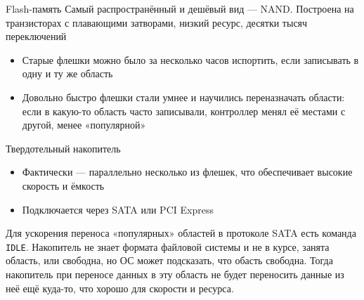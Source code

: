 \documentclass[xetex,aspectratio=43]{beamer}
\begin{document}
\begin{frame}
    \begin{block}{Flash-память}
        Самый распространённый и дешёвый вид --- NAND. Построена на транзисторах
        с плавающими затворами, низкий ресурс, десятки тысяч переключений

        \begin{itemize}
            \tightlist
            \item
            Старые флешки можно было за несколько часов испортить, если записывать
            в одну и ту же область
            \item
            Довольно быстро флешки стали умнее и научились переназначать области:
            если в какую-то область часто записывали, контроллер менял её местами
            с другой, менее «популярной»
        \end{itemize}
    \end{block}
\end{frame}

\begin{frame}[fragile]
    \begin{block}{Твердотельный накопитель}
        \begin{itemize}
            \tightlist
            \item
            Фактически --- параллельно несколько из флешек, что обеспечивает высокие скорость и
            ёмкость
            \item
            Подключается через SATA или PCI Express
        \end{itemize}

        Для ускорения переноса «популярных» областей в протоколе SATA есть
        команда \texttt{IDLE}. Накопитель не знает формата файловой системы и не
        в курсе, занята область, или свободна, но ОС может подсказать, что
        обасть свободна. Тогда накопитель при переносе данных в эту область не
        будет переносить данные из неё ещё куда-то, что хорошо для скорости и
        ресурса.

    \end{block}
\end{frame}
\end{document}
